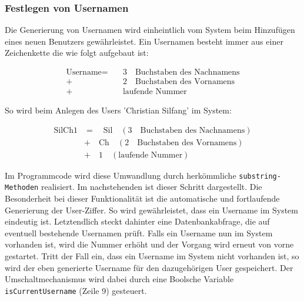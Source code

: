 	

\subsubsection{Festlegen von Usernamen}

Die Generierung von Usernamen wird einheintlich vom System beim Hinzufügen eines neuen Benutzers gewährleistet.
Ein Usernamen besteht immer aus einer Zeichenkette die wie folgt aufgebaut ist:

\[
\begin{split}
  \text{Username} =\quad & 3\quad \text{Buchstaben des Nachnamens}\\ 
  +\quad & 2 \quad \text{Buchstaben des Vornamens}\\ 
  +\quad & \text{laufende Nummer}
\end{split}
\]

So wird beim Anlegen des Users 'Christian Silfang' im System:

\[
\begin{split}
  \text{SilCh1} &= \quad \text{Sil} \quad (3 \quad \text{Buchstaben des Nachnamens})\\ 
		&+ \quad \text{Ch} \quad (2 \quad \text{Buchstaben des Vornamens})\\ 
		&+ \quad 1 \quad (\text{laufende Nummer})
\end{split}
\]

Im Programmcode wird diese Umwandlung durch herkömmliche \texttt{substring-Methoden} realisiert.
Im nachstehenden  ist dieser Schritt dargestellt. Die Besonderheit bei dieser Funktionalität ist die automatische und fortlaufende Generierung der User-Ziffer. So wird gewährleistet, dass ein Username im System eindeutig ist. Letztendlich steckt dahinter eine Datenbankabfrage, die auf eventuell bestehende Usernamen prüft.
Falls ein Username nun im System vorhanden ist, wird die Nummer erhöht und der Vorgang wird erneut von vorne gestartet. Tritt der Fall ein, dass ein Username im System nicht vorhanden ist, so wird der eben generierte Username für den dazugehörigen User gespeichert. Der Umschaltmechanismus wird dabei durch eine Boolsche Variable \texttt{isCurrentUsername} (Zeile 9) gesteuert.


